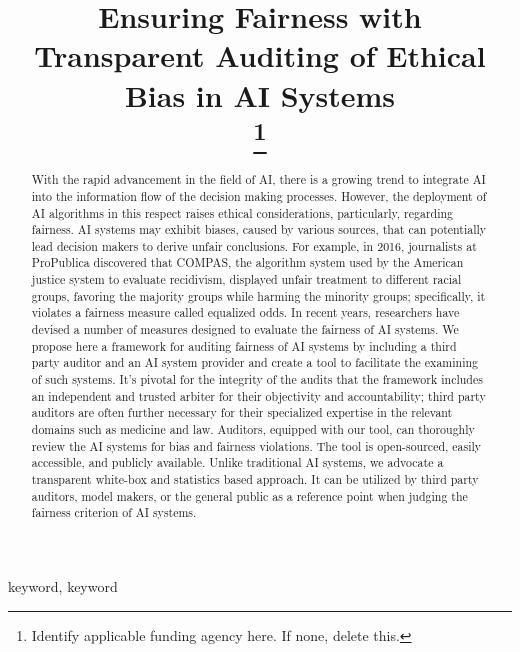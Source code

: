 \documentclass[conference]{IEEEtran}
\begin{document}
\title{Ensuring Fairness with Transparent Auditing of Ethical Bias in AI Systems\\
\thanks{Identify applicable funding agency here. If none, delete this.}
}

\author{
\and
{}
}

\maketitle

\begin{abstract}
With the rapid advancement in the field of AI, there is a growing trend to integrate AI into the information flow of the decision making processes. However, the deployment of AI algorithms in this respect raises ethical considerations, particularly, regarding fairness. AI systems may exhibit biases, caused by various sources, that can potentially lead decision makers to derive unfair conclusions. For example, in 2016, journalists at ProPublica discovered that COMPAS, the algorithm system used by the American justice system to evaluate recidivism, displayed unfair treatment to different racial groups, favoring the majority groups while harming the minority groups; specifically, it violates a fairness measure called equalized odds. In recent years, researchers have devised a number of measures designed to evaluate the fairness of AI systems. We propose here a framework for auditing fairness of AI systems by including a third party auditor and an AI system provider and create a tool to facilitate the examining of such systems. It's pivotal for the integrity of the audits that the framework includes an independent and trusted arbiter for their objectivity and accountability; third party auditors are often further necessary for their specialized expertise in the relevant domains such as medicine and law. Auditors, equipped with our tool, can thoroughly review the AI systems for bias and fairness violations. The tool is open-sourced, easily accessible, and publicly available. Unlike traditional AI systems, we advocate a transparent white-box and statistics based approach. It can be utilized by third party auditors, model makers, or the general public as a reference point when judging the fairness criterion of AI systems.
\end{abstract}

\begin{IEEEkeywords}
keyword, keyword
\end{IEEEkeywords}
\end{document}
